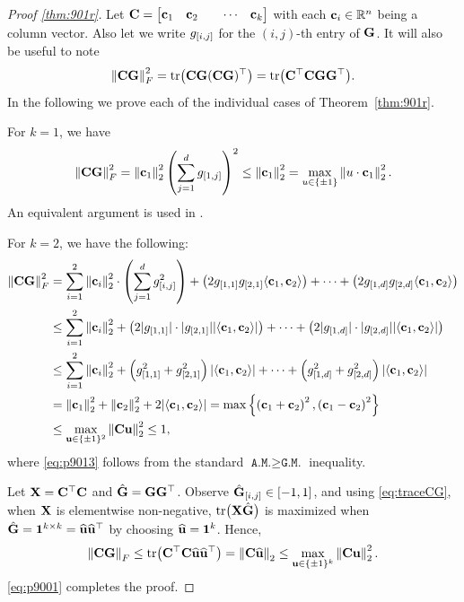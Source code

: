 \begin{proof}[Proof \cref{thm:901r}]
Let $\mathbf{C}=\begin{bmatrix} \mathbf{c}_1 & \mathbf{c}_2 & & \cdots & \mathbf{c}_k \end{bmatrix} $ with each $\mathbf{c}_i\in \mathbb{R}^n$ being a column vector. Also let we write $g_{[i, j]}$ for the $(i,j)$-th entry of $\mathbf{G}$. It will also be useful to note
\begin{equation}\label{eq:traceCG}
\left\|\mathbf{C}\mathbf{G}\right\|_F^2 
  = \mathrm{tr}\big(\mathbf{C} \mathbf{G} (\mathbf{C} \mathbf{G})^\top \big)
  = \mathrm{tr}\big(\mathbf{C}^\top \mathbf{C} \mathbf{G}\mathbf{G}^\top \big).
\end{equation}
In the following we prove each of the individual cases of Theorem~\ref{thm:901r}.

 For $k=1$, we have
\begin{equation*}
    \lfrob{\bfC\bfG}^2=\ltwo{\bfc_1}^2\left(\sum\limits_{j=1}^d\g{1}{j}\right)^2\leq\ltwo{\bfc_1}^2=\max\limits_{u\in\{\pm 1\}}\ltwo{u\cdot\bfc_1}^2.%
\end{equation*}
An equivalent argument is used in \citet[Thm. 3.1]{denisov22matfact}.

For $k=2$, we have the following:
\begin{align}
    \lfrob{\bfC\bfG}^2&=\sum_{i=1}^2\ltwo{\bfc_i}^2\cdot\left(\sum_{j=1}^d\g{i}{j}^2\right) 
         + \left(2\g{1}{1}\g{2}{1}\ip{\bfc_1}{\bfc_2}\right)
         + \cdots +
         {\left(2\g{1}{d}\g{2}{d}\ip{\bfc_1}{\bfc_2}\right)}\nonumber\\
         &\leq \sum_{i=1}^2\ltwo{\bfc_i}^2+\left(2|\g{1}{1}|\cdot|\g{2}{1}||\ip{\bfc_1}{\bfc_2}|\right)+\cdots+\left(2|\g{1}{d}|\cdot|\g{2}{d}||\ip{\bfc_1}{\bfc_2}|\right)\nonumber\\
         &\leq \sum_{i=1}^2\ltwo{\bfc_i}^2+\left(\g{1}{1}^2+\g{2}{1}^2\right)|\ip{\bfc_1}{\bfc_2}|+\cdots+\left(\g{1}{d}^2+\g{2}{d}^2\right)|\ip{\bfc_1}{\bfc_2}| \label{eq:p9013} \\
         &=\ltwo{\bfc_1}^2+\ltwo{\bfc_2}^2+2|\ip{\bfc_1}{\bfc_2}|
          =\max\left\{\left(\bfc_1+\bfc_2\right)^2,\left(\bfc_1-\bfc_2\right)^2\right\} \nonumber\\
          &\leq \max\limits_{\bfu\in\{\pm 1\}^2}\ltwo{\bfC\bfu}^2\leq 1,\nonumber %
\end{align}
where \cref{eq:p9013} follows from the standard $\texttt{A.M.}\geq\texttt{G.M.}$ inequality. %

 Let $\mathbf{X} = \mathbf{C}^\top\mathbf{C}$ and $\hat{\mathbf{G}} = \mathbf{G} \mathbf{G}^\top$. Observe  $\hat{\mathbf{G}}_{[i, j]}\in [-1, 1]$, and using \cref{eq:traceCG}, when $\mathbf{X}$ is elementwise non-negative, $\mathrm{tr}\big(\mathbf{X} \hat{\mathbf{G}}\big)$ is maximized when $\hat{\mathbf{G}} = \mathbf{1}^{k \times k} = \widehat{\mathbf{u}} \widehat{\mathbf{u}}^\top$ by choosing $\widehat{\mathbf{u}} = \mathbf{1}^k$. Hence,
\begin{equation}
    \left\|\mathbf{C}\mathbf{G}\right\|_F\leq \mathrm{tr}\big(\mathbf{C}^\top\mathbf{C}\widehat{\mathbf{u}} \widehat{\mathbf{u}}^\top\big)=\left\|\mathbf{C}\widehat{\mathbf{u}}\right\|_2\leq \max\limits_{\mathbf{u}\in\{\pm 1\}^k}\left\|\mathbf{C}\mathbf{u}\right\|_2^2.\label{eq:p9001}
\end{equation}
\cref{eq:p9001} completes the proof.


\end{proof}
